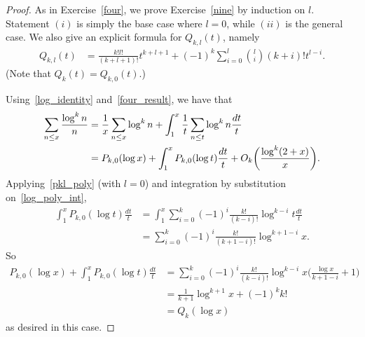 \documentclass[11pt]{article}
\begin{document}
\begin{proof}
As in Exercise~\ref{four}, we prove Exercise~\ref{nine} by induction on $l$. Statement $(i)$ is simply the base case where $l=0$, while $(ii)$ is the general case. We also give an explicit formula for $Q_{k,l}(t)$, namely
\begin{align}
Q_{k,l}(t) &= \frac{k!l!}{(k+l+1)!}t^{k+l+1}+(-1)^k\sum_{i=0}^l\binom{l}{i}(k+i)!t^{l-i}.\label{qkl_poly}
\end{align}
(Note that $Q_k(t)=Q_{k,0}(t)$.)

Using~\eqref{log_identity} and~\eqref{four_result}, we have that
\begin{align}
\sum_{n\leq x}\frac{\log^k{n}}{n} &= \frac{1}{x}\sum_{n\leq x}\log^k{n}+\int_1^x\frac{1}{t}\sum_{n\leq t}\log^k{n}\frac{dt}{t}\notag\\
&= P_{k,0}(\log{x})+\int_1^xP_{k,0}(\log{t})\frac{dt}{t}+O_k\bigg(\frac{\log^k(2+x)}{x}\bigg).\label{log_poly_int}
\end{align}
Applying~\eqref{pkl_poly} (with $l=0$) and integration by substitution on~\eqref{log_poly_int},
\begin{align*}
\int_1^xP_{k,0}(\log{t})\frac{dt}{t} &= \int_1^x\sum_{i=0}^k(-1)^i\frac{k!}{(k-i)!}\log^{k-i}{t}\frac{dt}{t}\\
&= \sum_{i=0}^k(-1)^i\frac{k!}{(k+1-i)!}\log^{k+1-i}{x}.
\end{align*}
So
\begin{align*}
P_{k,0}(\log{x})+\int_1^xP_{k,0}(\log{t})\frac{dt}{t} &= \sum_{i=0}^k(-1)^i\frac{k!}{(k-i)!}\log^{k-i}{x}\bigg(\frac{\log{x}}{k+1-i}+1\bigg)\\
&=\frac{1}{k+1}\log^{k+1}{x}+(-1)^kk!\\
&= Q_k(\log{x})
\end{align*}
as desired in this case.


\end{proof}
\end{document}
